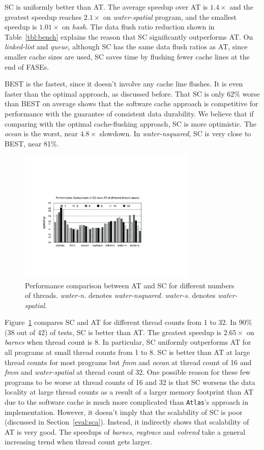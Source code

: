\documentclass[preprint,nocopyrightspace,10pt]{sigplanconf}
\begin{document}
SC is uniformly better than AT. The average speedup over AT is $1.4\times$ and the
greatest speedup reaches $2.1\times$ on \emph{water-spatial} program, and the
smallest speedup is $1.01\times$ on \emph{hash}. The data flush ratio reduction
shown in Table~\ref{tbl:bench} explains the reason that SC significantly outperforms 
AT. On \emph{linked-list} and \emph{queue}, although SC has the same data flush ratios
as AT, since smaller cache sizes are used, SC saves time by flushing fewer cache lines at the end of FASEs.

BEST is the fastest, since it doesn't involve any cache line flushes. It is even
faster than the optimal approach, as discussed before. That SC is only $62\%$ worse than 
BEST on average shows that the software cache approach is competitive for performance with
the guarantee of consistent data durability. We believe that if comparing with the optimal 
cache-flushing approach, SC is more optimistic. The \emph{ocean} is the worst, near 
$4.8\times$ slowdown. In \emph{water-nsquared}, SC is very close to BEST, near 81\%.

\begin{figure}[hbpt]
\centering
\includegraphics[width=8.5cm]{figures/perf_sc2at.pdf}
\caption{Performance comparison between AT and SC for different numbers 
of threads.  \emph{water-n.} denotes \emph{water-nsquared}.
 \emph{water-s.} denotes \emph{water-spatial}. }
\label{fig:perf2}
\end{figure}

Figure~\ref{fig:perf2} compares SC and AT for different thread counts from 1 to 32.
In 90\% (38 out of 42) of tests, SC is better than AT. The greatest speedup is $2.65\times$ on
\emph{barnes} when thread count is 8. In particular, SC uniformly outperforms AT 
for all programs at small thread counts from 1 to 8. SC is better than AT at large thread counts
for most programs but \emph{fmm} and \emph{ocean} at thread count of 16 and \emph{fmm} 
and \emph{water-spatial} at thread count of 32. One possible reason for these few programs 
to be worse at thread counts of 16 and 32 is that SC worsens the data locality at large thread 
counts as a result of a larger memory footprint than AT due to the software cache is much more 
complicated than \texttt{Atlas}'s approach in implementation. However, it doesn't imply that the 
scalability of SC is poor (discussed in Section~\ref{eval:sca}). Instead, it indirectly shows that 
scalability of AT is very good. The speedups of \emph{barnes}, \emph{raytrace} and 
\emph{volrend} take a general increasing trend when thread count gets larger. 
\end{document}
